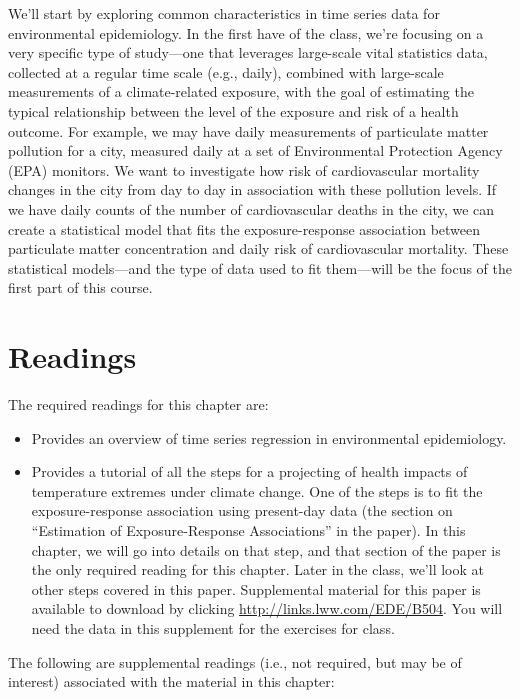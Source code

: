 \documentclass[
]{book}
\providecommand{\tightlist}{%
  \setlength{\itemsep}{0pt}\setlength{\parskip}{0pt}}
\begin{document}
We'll start by exploring common characteristics in time series data for
environmental epidemiology. In the first have of the class, we're
focusing on a very specific type of study---one that leverages large-scale
vital statistics data, collected at a regular time scale (e.g., daily),
combined with large-scale measurements of a climate-related exposure, with
the goal of estimating the typical relationship between the level of the
exposure and risk of a health outcome. For example, we may have daily
measurements of particulate matter pollution for a city, measured daily at a set
of Environmental Protection Agency (EPA) monitors. We want to investigate
how risk of cardiovascular mortality changes in the city from day to day
in association with these pollution levels. If we have daily counts of the
number of cardiovascular deaths in the city, we can create a statistical
model that fits the exposure-response association between particulate matter
concentration and daily risk of cardiovascular mortality. These statistical
models---and the type of data used to fit them---will be the focus of the
first part of this course.

\hypertarget{readings}{%
\section{Readings}\label{readings}}

The required readings for this chapter are:

\begin{itemize}
\tightlist
\item
  \citet{bhaskaran2013time} Provides an overview of time series regression
  in environmental epidemiology.
\item
  \citet{vicedo2019hands} Provides a tutorial of all the steps for a
  projecting of health impacts of temperature extremes under climate change.
  One of the steps is to fit the exposure-response association using present-day data
  (the section on ``Estimation of Exposure-Response Associations'' in the paper).
  In this chapter, we will go into details on that step, and that section of the paper
  is the only required reading for this chapter. Later in the class, we'll
  look at other steps covered in this paper. Supplemental material for this paper is
  available to download by
  clicking \url{http://links.lww.com/EDE/B504}. You will need the data in this supplement
  for the exercises for class.
\end{itemize}

The following are supplemental readings (i.e., not required, but may be of
interest) associated with the material in this chapter:
\end{document}
